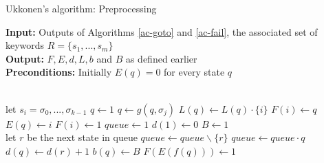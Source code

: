 \documentclass[english,twoside,censored,csm,algorithms-track-2020]{HYthesisML}
\theoremstyle{plain}
\theoremstyle{definition}
\begin{document}
  \begin{algorithm}[!ht]

    \caption{Ukkonen's algorithm: Preprocessing} \label{ukk-pre}
    \hspace*{\algorithmicindent} \textbf{Input:} Outputs of Algorithms \ref{ac-goto} and \ref{ac-fail}, the associated set of keywords $R=\{s_1,...,s_m\}$ \\
    \hspace*{\algorithmicindent} \textbf{Output:} $F, E, d, L, b$ and $B$ as defined earlier\\
    \hspace*{\algorithmicindent} \textbf{Preconditions:} Initially $E(q) = 0$ for every state $q$
    
    \begin{algorithmic}[1]
         \\
          \hspace*{1.1cm plus \algorithmicindent} let $s_i = \sigma_0,...,\sigma_{k-1}$
          \State $q\gets 1$
            \State $q\gets g(q,\sigma_j)$
            \State $L(q)\gets L(q) \cdot \{i\}$ \footnotemark[1]
              \State $F(i)\gets q$
              \State $E(q)\gets i$
                \State $F(i)\gets 1$
              \EndIf
            \EndIf
          \EndFor
        \EndFor
        \State $queue\gets 1$
        \State $d(1)\gets 0$
        \State $B\gets 1$
        \\
          \hspace*{1.1cm plus \algorithmicindent} let $r$ be the next state in queue
          \State $queue\gets queue \backslash \{r\}$
           \footnotemark[2]
            \State $queue\gets queue\cdot q$
            \State $d(q)\gets d(r)+1$
            \State $b(q)\gets B$
            \State $F(E(f(q)))\gets 1$
          \EndFor
        \EndWhile
      \EndFunction
        
    \end{algorithmic}
  \end{algorithm}


\end{document}
